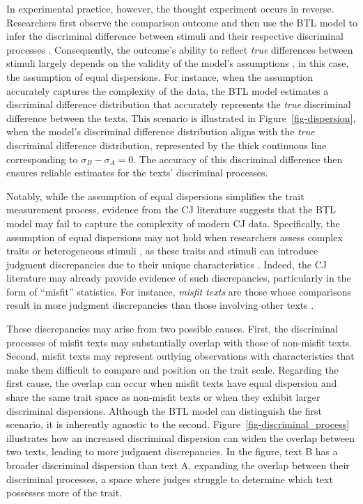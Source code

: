 \documentclass[
  authoryear,
  review,
  1p]{elsarticle}
\begin{document}
In experimental practice, however, the thought experiment occurs in
reverse. Researchers first observe the comparison outcome and then use
the BTL model to infer the discriminal difference between stimuli and
their respective discriminal processes \citep[pp.~373]{Thurstone_1927a}.
Consequently, the outcome's ability to reflect \emph{true} differences
between stimuli largely depends on the validity of the model's
assumptions \citep[pp.~150]{Kohler_et_al_2019}, in this case, the
assumption of equal dispersions. For instance, when the assumption
accurately captures the complexity of the data, the BTL model estimates
a discriminal difference distribution that accurately represents the
\emph{true} discriminal difference between the texts. This scenario is
illustrated in Figure~\ref{fig-dispersion}, when the model's discriminal
difference distribution aligns with the \emph{true} discriminal
difference distribution, represented by the thick continuous line
corresponding to \(\sigma_{B}-\sigma_{A}=0\). The accuracy of this
discriminal difference then ensures reliable estimates for the texts'
discriminal processes.

Notably, while the assumption of equal dispersions simplifies the trait
measurement process, evidence from the CJ literature suggests that the
BTL model may fail to capture the complexity of modern CJ data.
Specifically, the assumption of equal dispersions may not hold when
researchers assess complex traits or heterogeneous stimuli
\citetext{\citealp[pp.~376]{Thurstone_1927a}; \citealp[pp.~273]{Bramley_2008}; \citealp[pp.~678]{Kelly_et_al_2022}},
as these traits and stimuli can introduce judgment discrepancies due to
their unique characteristics
\citep{vanDaal_et_al_2016, Lesterhuis_2018, Chambers_et_al_2022}.
Indeed, the CJ literature may already provide evidence of such
discrepancies, particularly in the form of ``misfit'' statistics. For
instance, \emph{misfit texts} are those whose comparisons result in more
judgment discrepancies than those involving other texts
\citetext{\citealp[pp.~11]{Pollitt_2004}; \citealp[pp.~290]{Pollitt_2012b}}.

These discrepancies may arise from two possible causes. First, the
discriminal processes of misfit texts may substantially overlap with
those of non-misfit texts. Second, misfit texts may represent outlying
observations with characteristics that make them difficult to compare
and position on the trait scale. Regarding the first cause, the overlap
can occur when misfit texts have equal dispersion and share the same
trait space as non-misfit texts or when they exhibit larger discriminal
dispersions. Although the BTL model can distinguish the first scenario,
it is inherently agnostic to the second.
Figure~\ref{fig-discriminal_process} illustrates how an increased
discriminal dispersion can widen the overlap between two texts, leading
to more judgment discrepancies. In the figure, text B has a broader
discriminal dispersion than text A, expanding the overlap between their
discriminal processes, a space where judges struggle to determine which
text possesses more of the trait.
\end{document}
